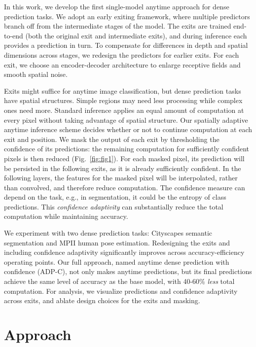 \documentclass{article} %
\begin{document}
In this work, we develop the first single-model anytime approach for dense prediction tasks.
We adopt an early exiting framework, where multiple predictors branch off from the intermediate stages of the model.
The exits are trained end-to-end (both the original exit and intermediate exits), and during inference each provides a prediction in turn.
To compensate for differences in depth and spatial dimensions across stages, we redesign the predictors for earlier exits.
For each exit, we choose an encoder-decoder architecture to enlarge receptive fields and smooth spatial noise.

Exits might suffice for anytime image classification, but dense prediction tasks have spatial structures.
Simple regions may need less processing while complex ones need more.
Standard inference applies an equal amount of computation at every pixel without taking advantage of spatial structure.
Our spatially adaptive anytime inference scheme decides whether or not to continue computation at each exit and position.
We mask the output of each exit by thresholding the confidence of its predictions: the remaining computation for sufficiently confident pixels is then reduced (Fig.~\ref{fig:fig1}).
For each masked pixel, its prediction will be persisted in the following exits, as it is already sufficiently confident.
In the following layers, the features for the masked pixel will be interpolated, rather than convolved, and therefore reduce computation.
The confidence measure can depend on the task, e.g., in segmentation, it could be the entropy of class predictions.
This \emph{confidence adaptivity} can substantially reduce the total computation while maintaining accuracy. 


We experiment with two dense prediction tasks: Cityscapes semantic segmentation and MPII human pose estimation. 
Redesigning the exits and including confidence adaptivity significantly improves across accuracy-efficiency operating points.
Our full approach, named anytime dense prediction with confidence (ADP-C), not only makes anytime predictions, but its final predictions achieve the same level of accuracy as the base model, with 40-60\% \emph{less} total computation.
For analysis, we visualize predictions and confidence adaptivity across exits, and ablate design choices for the exits and masking.


\section{Approach}
\label{sec:approach}
\end{document}
